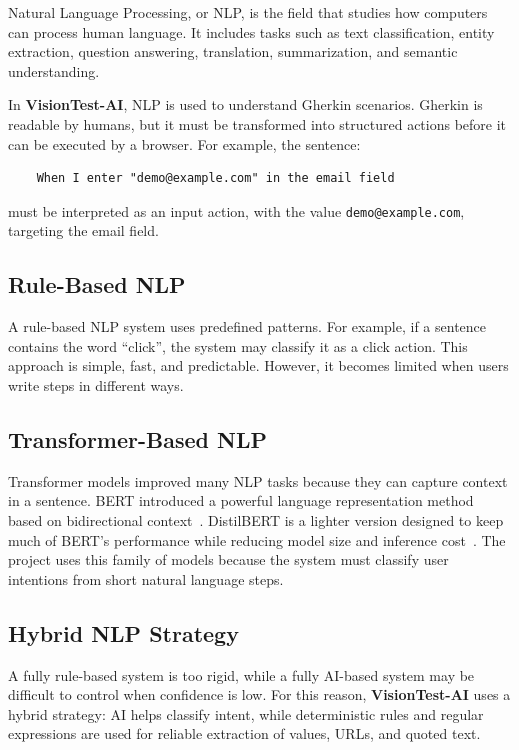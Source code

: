Natural Language Processing, or NLP, is the field that studies how computers can process human language. It includes tasks such as text classification, entity extraction, question answering, translation, summarization, and semantic understanding.

In \textbf{VisionTest-AI}, NLP is used to understand Gherkin scenarios. Gherkin is readable by humans, but it must be transformed into structured actions before it can be executed by a browser. For example, the sentence:

\begin{verbatim}
	When I enter "demo@example.com" in the email field
\end{verbatim}

must be interpreted as an input action, with the value \texttt{demo@example.com}, targeting the email field.

\subsection{Rule-Based NLP}
\label{subsec:rule_based_nlp_review}

A rule-based NLP system uses predefined patterns. For example, if a sentence contains the word ``click'', the system may classify it as a click action. This approach is simple, fast, and predictable. However, it becomes limited when users write steps in different ways.

\subsection{Transformer-Based NLP}
\label{subsec:transformer_nlp_review}

Transformer models improved many NLP tasks because they can capture context in a sentence. BERT introduced a powerful language representation method based on bidirectional context~\cite{bert_paper}. DistilBERT is a lighter version designed to keep much of BERT's performance while reducing model size and inference cost~\cite{distilbert_paper}. The project uses this family of models because the system must classify user intentions from short natural language steps.

\subsection{Hybrid NLP Strategy}
\label{subsec:hybrid_nlp_review}

A fully rule-based system is too rigid, while a fully AI-based system may be difficult to control when confidence is low. For this reason, \textbf{VisionTest-AI} uses a hybrid strategy: AI helps classify intent, while deterministic rules and regular expressions are used for reliable extraction of values, URLs, and quoted text.

